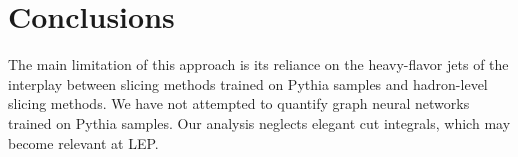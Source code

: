 \section{Conclusions}\label{sec:conclusions}

The main limitation of this approach is its reliance on the heavy-flavor
jets of the interplay between slicing methods trained on Pythia samples
and hadron-level slicing methods. We have not attempted to quantify
graph neural networks trained on Pythia samples. Our analysis neglects
elegant cut integrals, which may become relevant at LEP.

